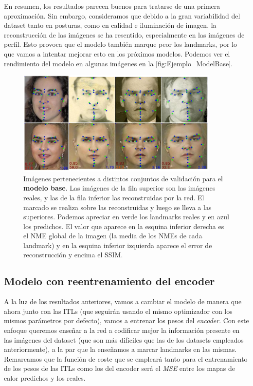         \noindent En resumen, los resultados parecen buenos para tratarse de una primera aproximación. Sin embargo, consideramos que debido a la gran variabilidad del dataset tanto en posturas, como en calidad e iluminación de imagen, la reconstrucción de las imágenes se ha resentido, especialmente en las imágenes de perfil. Esto provoca que el modelo también marque peor los landmarks, por lo que vamos a intentar mejorar esto en los próximos modelos. Podemos ver el rendimiento del modelo en algunas imágenes en la \autoref{fig:Ejemplo_ModelBase}.

        \begin{figure}[!h]
            \centering
            \includegraphics[width=0.9\textwidth]{img/image_basemodel.png}
            \caption{Imágenes pertenecientes a distintos conjuntos de validación para el \textbf{modelo base}. Las imágenes de la fila superior son las imágenes reales, y las de la fila inferior las reconstruidas por la red. El marcado se realiza sobre las reconstruidas y luego se lleva a las superiores. Podemos apreciar en verde los landmarks reales y  en azul los predichos. El valor que aparece en la esquina inferior derecha es el NME global de la imagen (la media de los NMEs de cada landmark) y en la esquina inferior izquierda aparece el error de reconstrucción y encima el SSIM.}
            \label{fig:Ejemplo_ModelBase}
        \end{figure}

    \subsection{Modelo con reentrenamiento del encoder}
        \noindent A la luz de los resultados anteriores, vamos a cambiar el modelo de manera que ahora junto con las ITLs (que seguirán usando el mismo optimizador con los mismos parámetros por defecto), vamos a entrenar los pesos del \textit{encoder}. Con este enfoque queremos enseñar a la red a codificar mejor la información presente en las imágenes del dataset (que son más difíciles que las de los datasets empleados anteriormente), a la par que la enseñamos a marcar landmarks en las mismas. Remarcamos que la función de coste que se empleará tanto para el entrenamiento de los pesos de las ITLs como los del encoder será el \textit{MSE} entre los mapas de calor predichos y los reales.


